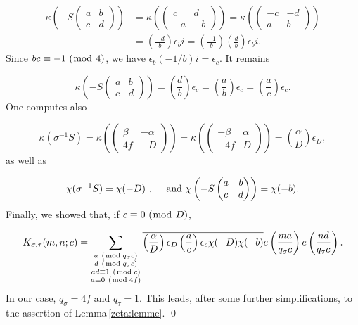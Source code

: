 \documentclass[leqno,10pt]{amsart}
\theoremstyle{plain}
\numberwithin{equation}{section}
\theoremstyle{definition}
\theoremstyle{remark}
\begin{document}
\begin{align*}
\kappa\left(-S \begin{pmatrix} a&b \\ c&d \end{pmatrix}\right) 
&=\kappa\left(\begin{pmatrix} c&d \\ -a&-b \end{pmatrix}\right)=\kappa\left(\begin{pmatrix} -c&-d \\ a&b \end{pmatrix}\right)\\
&= \left(\frac{-d}{b}\right) \epsilon_b i=\left(\frac{-1}{b}\right)\left(\frac{d}{b}\right) \epsilon_b i .
\end{align*}
Since $bc\equiv -1\ (\bmod\  4)$, we have $\epsilon_{b} (-1/b) i =\epsilon_c$. It remains

\begin{equation*}
\kappa\left(-S \begin{pmatrix} a&b \\ c&d \end{pmatrix}\right) 
= \left(\frac{d}{b}\right) \epsilon_c= \left(\frac{a}{b}\right) \epsilon_c = \left(\frac{a}{c}\right) \epsilon_c.
\end{equation*}
One computes also

\begin{equation*}
\kappa(\sigma^{-1}S) = \kappa \left( \begin{pmatrix} \beta & -\alpha \\ 4f & -D \end{pmatrix}\right) =\kappa \left( \begin{pmatrix} -\beta & \alpha \\ -4f & D \end{pmatrix}\right)= \left(\frac{\alpha}{D}\right) \epsilon_D,
\end{equation*}
as well as

\begin{equation*}
\chi(\sigma^{-1}S) =\chi(-D) \ , \quad \textnormal{ and }  \chi\left( -S \begin{pmatrix} a&b \\ c&d \end{pmatrix}\right) =\chi(-b).
\end{equation*}
Finally, we showed that, if $c\equiv 0\ (\bmod\  D)$,

\begin{gather*}
K_{\sigma,\tau}(m,n;c)=
\sum_{\substack{a\ (\!\bmod q_\sigma c)\\d\ (\!\bmod q_\tau c)\\ ad\equiv 1\ (\!\bmod c)\\ a\equiv 0\ (\!\bmod 4f)}} 
\overline{\left(\frac{\alpha}{D}\right) \epsilon_D  \left(\frac{a}{c}\right) \epsilon_c \chi(-D) \chi(-b)} e\left(\frac{m a}{q_\sigma c}\right) e\left( \frac{n d}{q_\tau c}\right).
\end{gather*}
In our case, $q_\sigma=4f$ and $q_\tau=1$. This leads, after some further simplifications, to the assertion of Lemma\,\ref{zeta:lemme}.
\qed
\end{document}
